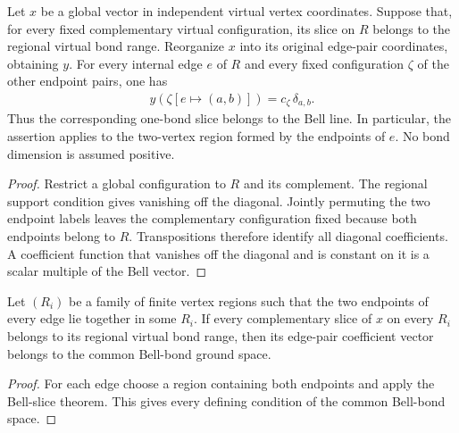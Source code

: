 \begin{lemma}%
    \label{thm:peps_region_virtual_bell_slice}
    \leanok
    Let $x$ be a global vector in independent virtual vertex coordinates.
    Suppose that, for every fixed complementary virtual configuration,
    its slice on $R$ belongs to the regional virtual bond range.
    Reorganize $x$ into its original edge-pair coordinates, obtaining $y$.
    For every internal edge $e$ of $R$ and every fixed configuration
    $\zeta$ of the other endpoint pairs, one has
    \begin{align*}
        y(\zeta[e\mapsto(a,b)])
        =c_\zeta\,\delta_{a,b}.
    \end{align*}
    Thus the corresponding one-bond slice belongs to the Bell line.
    In particular, the assertion applies to the two-vertex region
    formed by the endpoints of $e$. No bond dimension is assumed
    positive.
\end{lemma}

\begin{proof}\leanok
    Restrict a global configuration to $R$ and its complement.
    The regional support condition gives vanishing off the diagonal.
    Jointly permuting the two endpoint labels leaves the complementary
    configuration fixed because both endpoints belong to $R$.
    Transpositions therefore identify all diagonal coefficients.
    A coefficient function that vanishes off the diagonal and is
    constant on it is a scalar multiple of the Bell vector.
\end{proof}

\begin{lemma}%
    \label{thm:peps_regional_virtual_conditions_bell}
    \leanok
    Let $(R_i)$ be a family of finite vertex regions such that the two
    endpoints of every edge lie together in some $R_i$.
    If every complementary slice of $x$ on every $R_i$ belongs to
    its regional virtual bond range, then its edge-pair
    coefficient vector belongs to the common Bell-bond ground space.
\end{lemma}

\begin{proof}\leanok
    For each edge choose a region containing both endpoints and apply
    the Bell-slice theorem. This gives every defining condition of
    the common Bell-bond space.
\end{proof}
